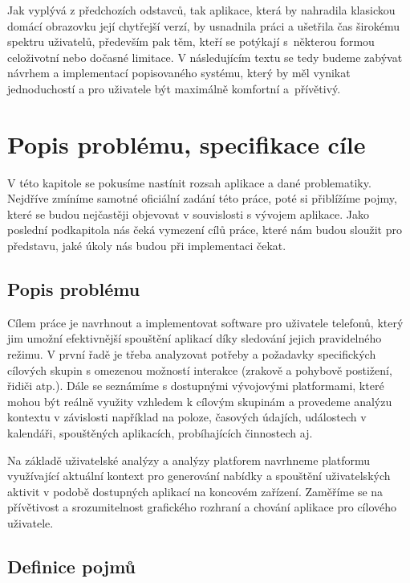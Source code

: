 \documentclass[thesis=M,czech]{FITthesis}[2012/06/26]
\begin{document}
\begin{introduction}
Jak vyplývá z předchozích odstavců, tak aplikace, která by nahradila klasickou domácí obrazovku její chytřejší verzí, by usnadnila práci a ušetřila čas širokému spektru uživatelů, především pak těm, kteří se potýkají s~některou formou celoživotní nebo dočasné limitace. V následujícím textu se tedy budeme zabývat návrhem a implementací popisovaného systému, který by měl vynikat jednoduchostí a pro uživatele být maximálně komfortní a~přívětivý.

\section{Popis problému, specifikace cíle}

V této kapitole se pokusíme nastínit rozsah aplikace a dané problematiky. Nejdříve zmíníme samotné oficiální zadání této práce, poté si přiblížíme pojmy, které se budou nejčastěji objevovat v souvislosti s vývojem aplikace. Jako poslední podkapitola nás čeká vymezení cílů práce, které nám budou sloužit pro představu, jaké úkoly nás budou při implementaci čekat.

\subsection{Popis problému}

Cílem práce je navrhnout a implementovat software pro uživatele  telefonů, který jim umožní efektivnější spouštění aplikací díky sledování jejich pravidelného režimu. V první řadě je třeba analyzovat potřeby a požadavky specifických cílových skupin s omezenou možností interakce (zrakově a pohybově postižení, řidiči atp.). Dále se seznámíme s dostupnými vývojovými platformami, které mohou být reálně využity vzhledem k cílovým skupinám a provedeme analýzu kontextu v závislosti například na poloze, časových údajích, událostech v kalendáři, spouštěných aplikacích, probíhajících činnostech aj.

Na základě uživatelské analýzy a analýzy platforem navrhneme platformu využívající aktuální kontext pro generování nabídky a spouštění uživatelských aktivit v podobě dostupných aplikací na koncovém zařízení. Zaměříme se na přívětivost a srozumitelnost grafického rozhraní a chování aplikace pro cílového uživatele.

\subsection{Definice pojmů}


\end{introduction}
\end{document}

